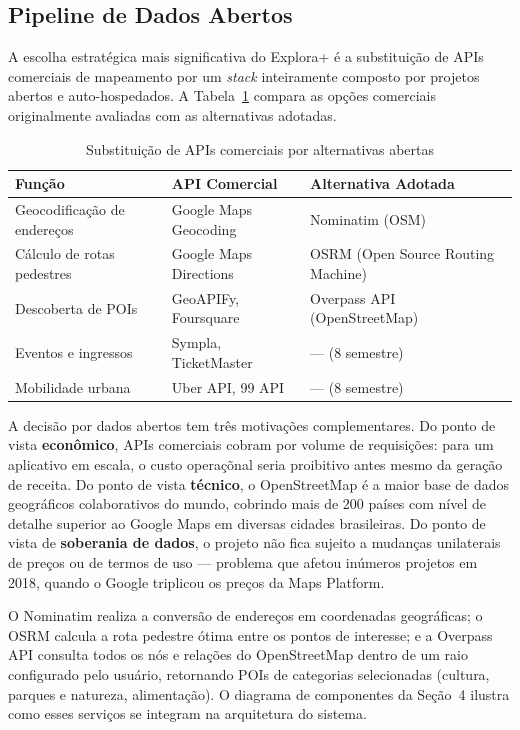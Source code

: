 \documentclass[12pt, a4paper]{article}
\begin{document}
\subsection{Pipeline de Dados Abertos}

A escolha estrat\'egica mais significativa do Explora+ \'e a substitui\c{c}\~ao de APIs comerciais de mapeamento por um \emph{stack} inteiramente composto por projetos abertos e auto-hospedados. A Tabela~\ref{tab:apis} compara as op\c{c}\~oes comerciais originalmente avaliadas com as alternativas adotadas.

\begin{table}[H]
\centering
\caption{Substitui\c{c}\~ao de APIs comerciais por alternativas abertas}
\label{tab:apis}
\small
\begin{tabular}{p{3.8cm}p{3.8cm}p{4.8cm}}
\toprule
\textbf{Fun\c{c}\~ao} & \textbf{API Comercial} & \textbf{Alternativa Adotada} \\
\midrule
Geocodifica\c{c}\~ao de endere\c{c}os & Google Maps Geocoding & Nominatim (OSM) \\
C\'alculo de rotas pedestres & Google Maps Directions & OSRM (Open Source Routing Machine) \\
Descoberta de POIs & GeoAPIFy, Foursquare & Overpass API (OpenStreetMap) \\
Eventos e ingressos & Sympla, TicketMaster & --- (8\textordmasculine{} semestre) \\
Mobilidade urbana & Uber API, 99 API & --- (8\textordmasculine{} semestre) \\
\bottomrule
\end{tabular}
\end{table}

A decis\~ao por dados abertos tem tr\^es motiva\c{c}\~oes complementares. Do ponto de vista \textbf{econ\^omico}, APIs comerciais cobram por volume de requisi\c{c}\~oes: para um aplicativo em escala, o custo opera\c{c}\~onal seria proibitivo antes mesmo da gera\c{c}\~ao de receita. Do ponto de vista \textbf{t\'ecnico}, o OpenStreetMap \parencite{osm2024} \'e a maior base de dados geogr\'aficos colaborativos do mundo, cobrindo mais de 200 pa\'ises com n\'ivel de detalhe superior ao Google Maps em diversas cidades brasileiras. Do ponto de vista de \textbf{soberania de dados}, o projeto n\~ao fica sujeito a mudan\c{c}as unilaterais de pre\c{c}os ou de termos de uso --- problema que afetou in\'umeros projetos em 2018, quando o Google triplicou os pre\c{c}os da Maps Platform.

O Nominatim realiza a convers\~ao de endere\c{c}os em coordenadas geogr\'aficas; o OSRM calcula a rota pedestre \'otima entre os pontos de interesse; e a Overpass API consulta todos os n\'os e rela\c{c}\~oes do OpenStreetMap dentro de um raio configurado pelo usu\'ario, retornando POIs de categorias selecionadas (cultura, parques e natureza, alimenta\c{c}\~ao). O diagrama de componentes da Se\c{c}\~ao~4 ilustra como esses servi\c{c}os se integram na arquitetura do sistema.
\end{document}
